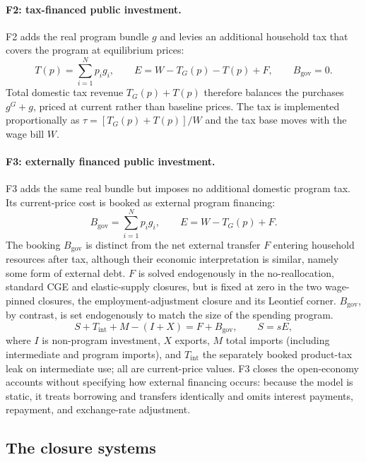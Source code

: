 \paragraph{F2: tax-financed public investment.}
F2 adds the real program bundle $g$ and levies an additional household
tax that covers the program at equilibrium prices:
\begin{equation}
T(p) = \sum_{i=1}^N p_i g_i,
\qquad E = W-T_G(p)-T(p)+F,
\qquad B_{\mathrm{gov}}=0.
\label{eq:closure-f2}
\end{equation}
Total domestic tax revenue $T_G(p)+T(p)$ therefore balances the purchases
$g^G+g$, priced at current rather than baseline prices. The tax is
implemented proportionally as $\tau=[T_G(p)+T(p)]/W$ and the tax base moves with the wage bill $W$.

\paragraph{F3: externally financed public investment.}
F3 adds the same real bundle but imposes no additional domestic program
tax. Its current-price cost is booked as external program financing:
\begin{equation}
B_{\mathrm{gov}} = \sum_{i=1}^N p_i g_i,
\qquad E = W-T_G(p)+F.
\label{eq:closure-f3}
\end{equation}
The booking $B_{\mathrm{gov}}$ is distinct from the net external transfer
$F$ entering household resources after tax, although their economic interpretation is similar, namely some form of external debt. $F$ is solved endogenously in the no-reallocation, standard CGE and elastic-supply closures, but is fixed at zero in the two wage-pinned closures, the employment-adjustment closure and its Leontief corner. $B_{\mathrm{gov}}$, by contrast, is set endogenously to match the size of the
spending program.
\begin{equation}
S + T_{\mathrm{int}} + M - (I+X) = F+B_{\mathrm{gov}},
\qquad S=sE,
\label{eq:financing-external-account}
\end{equation}
where $I$ is non-program investment, $X$ exports, $M$ total imports (including intermediate and program imports), and $T_{\mathrm{int}}$ the separately booked product-tax leak on intermediate use; all are current-price values. F3 closes the open-economy accounts without specifying how external financing occurs: because the model is static, it treats borrowing and transfers identically and omits interest payments, repayment, and exchange-rate adjustment.
\subsection{The closure systems}\label{app:closure-systems}

